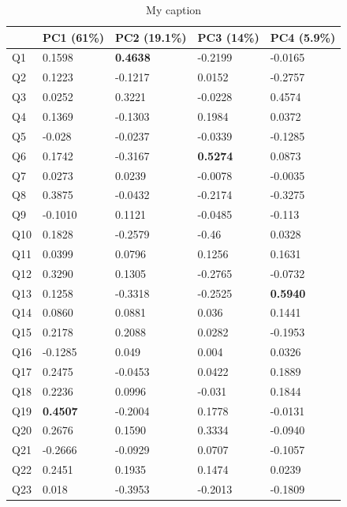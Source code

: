 \begin{table}[]
\centering
\caption{My caption}
\label{my-label}
\begin{tabular}{l|l|l|l|l}
    & PC1 (61\%)      & PC2 (19.1\%)    & PC3 (14\%)      & PC4 (5.9\%)     \\ \hline
Q1  & 0.1598          & \textbf{0.4638} & -0.2199         & -0.0165         \\ \hline
Q2  & 0.1223          & -0.1217         & 0.0152          & -0.2757         \\ \hline
Q3  & 0.0252          & 0.3221          & -0.0228         & 0.4574          \\ \hline
Q4  & 0.1369          & -0.1303         & 0.1984          & 0.0372          \\ \hline
Q5  & -0.028          & -0.0237         & -0.0339         & -0.1285         \\ \hline
Q6  & 0.1742          & -0.3167         & \textbf{0.5274} & 0.0873          \\ \hline
Q7  & 0.0273          & 0.0239          & -0.0078         & -0.0035         \\ \hline
Q8  & 0.3875          & -0.0432         & -0.2174         & -0.3275         \\ \hline
Q9  & -0.1010         & 0.1121          & -0.0485         & -0.113          \\ \hline
Q10 & 0.1828          & -0.2579         & -0.46           & 0.0328          \\ \hline
Q11 & 0.0399          & 0.0796          & 0.1256          & 0.1631          \\ \hline
Q12 & 0.3290          & 0.1305          & -0.2765         & -0.0732         \\ \hline
Q13 & 0.1258          & -0.3318         & -0.2525         & \textbf{0.5940} \\ \hline
Q14 & 0.0860          & 0.0881          & 0.036           & 0.1441          \\ \hline
Q15 & 0.2178          & 0.2088          & 0.0282          & -0.1953         \\ \hline
Q16 & -0.1285         & 0.049           & 0.004           & 0.0326          \\ \hline
Q17 & 0.2475          & -0.0453         & 0.0422          & 0.1889          \\ \hline
Q18 & 0.2236          & 0.0996          & -0.031          & 0.1844          \\ \hline
Q19 & \textbf{0.4507} & -0.2004         & 0.1778          & -0.0131         \\ \hline
Q20 & 0.2676          & 0.1590          & 0.3334          & -0.0940         \\ \hline
Q21 & -0.2666         & -0.0929         & 0.0707          & -0.1057         \\ \hline
Q22 & 0.2451          & 0.1935          & 0.1474          & 0.0239          \\ \hline
Q23 & 0.018           & -0.3953         & -0.2013         & -0.1809        
\end{tabular}
\end{table}
\noindent

